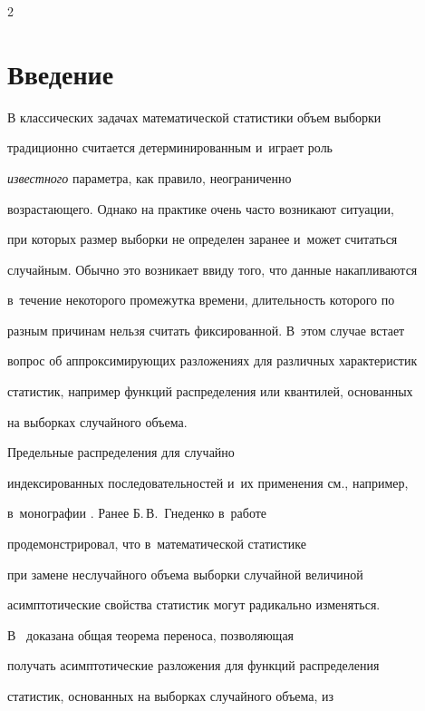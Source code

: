 \begin{multicols}{2}



\label{st\stat}





\section{Введение}



В классических задачах математической статистики  объем выборки

традиционно считается детерминированным и~играет роль

\textit{известного} параметра, как правило, неограниченно

возрастающего. Однако на практике очень часто    возникают ситуации,

при которых размер выборки не определен заранее и~может считаться

случайным. Обычно это возникает ввиду того, что данные накапливаются

в~течение некоторого промежутка  времени, длительность которого по

разным причинам нельзя считать фиксированной. В~этом случае встает

вопрос об аппроксимирующих разложениях для различных характеристик

статистик, например функций распределения или квантилей, основанных

на выборках случайного объема. 



Предельные распределения для случайно

индексированных последовательностей и~их применения см., например, 

в~монографии \cite{Example3}. Ранее Б.\,В.~Гнеденко в~работе

\cite{Example1}  продемонстрировал, что в~математической статистике

при замене неслучайного объема выборки случайной величиной

асимп\-то\-ти\-ческие свойства статистик могут радикально изменяться. 



В~\cite{BenKorGal} доказана общая теорема переноса, позволяющая

получать асимптотические раз\-ло\-же\-ния для функций распределения

статистик, основанных на выборках случайного объема, из


\end{multicols}
